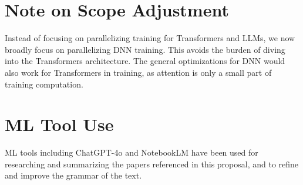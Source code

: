 \documentclass{article}
\begin{document}
\section{Note on Scope Adjustment}

Instead of focusing on parallelizing training for Transformers and LLMs, we now broadly focus on parallelizing DNN training. This avoids the burden of diving into the Transformers architecture. The general optimizations for DNN would also work for Transformers in training, as attention is only a small part of training computation.

% 

\printbibliography

\appendix

\section*{ML Tool Use}

ML tools including ChatGPT-4o  and NotebookLM have been used for researching and summarizing the papers referenced in this proposal, and to refine and improve the grammar of the text. 
\end{document}
